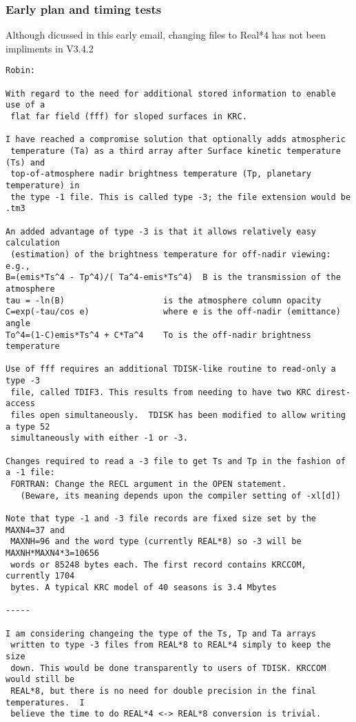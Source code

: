 \subsubsection{Early plan and timing tests}
Although dicussed in this early email, changing files to Real*4 has not been impliments in V3.4.2
\vspace{-3.mm} 
\begin{verbatim}
Robin:

With regard to the need for additional stored information to enable use of a
 flat far field (fff) for sloped surfaces in KRC. 

I have reached a compromise solution that optionally adds atmospheric
 temperature (Ta) as a third array after Surface kinetic temperature (Ts) and
 top-of-atmosphere nadir brightness temperature (Tp, planetary temperature) in
 the type -1 file. This is called type -3; the file extension would be .tm3  

An added advantage of type -3 is that it allows relatively easy calculation
 (estimation) of the brightness temperature for off-nadir viewing: e.g.,
B=(emis*Ts^4 - Tp^4)/( Ta^4-emis*Ts^4)  B is the transmission of the atmosphere
tau = -ln(B)                    is the atmosphere column opacity
C=exp(-tau/cos e)               where e is the off-nadir (emittance) angle
To^4=(1-C)emis*Ts^4 + C*Ta^4    To is the off-nadir brightness temperature

Use of fff requires an additional TDISK-like routine to read-only a type -3
 file, called TDIF3. This results from needing to have two KRC direst-access
 files open simultaneously.  TDISK has been modified to allow writing a type 52
 simultaneously with either -1 or -3.

Changes required to read a -3 file to get Ts and Tp in the fashion of a -1 file:
 FORTRAN: Change the RECL argument in the OPEN statement. 
   (Beware, its meaning depends upon the compiler setting of -xl[d])

Note that type -1 and -3 file records are fixed size set by the MAXN4=37 and
 MAXNH=96 and the word type (currently REAL*8) so -3 will be MAXNH*MAXN4*3=10656
 words or 85248 bytes each. The first record contains KRCCOM, currently 1704
 bytes. A typical KRC model of 40 seasons is 3.4 Mbytes

-----

I am considering changeing the type of the Ts, Tp and Ta arrays
 written to type -3 files from REAL*8 to REAL*4 simply to keep the size
 down. This would be done transparently to users of TDISK. KRCCOM would still be
 REAL*8, but there is no need for double precision in the final temperatures.  I
 believe the time to do REAL*4 <-> REAL*8 conversion is trivial.


\end{verbatim}
